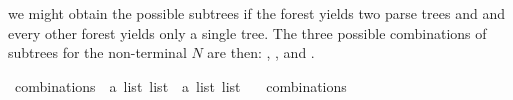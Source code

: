\begin{isabellebody}
\begin{isamarkuptext}
 we might obtain the possible subtrees  if the
forest  yields two parse trees  and  and every other forest yields only
a single tree. The three possible combinations of subtrees for the non-terminal $N$ are then: , ,
and .%
\end{isamarkuptext}\isamarkuptrue%
\isamarkupfalse%
\ combinations\ {\isacharcolon}{\kern0pt}{\isacharcolon}{\kern0pt}\ {\isachardoublequoteopen}{\isacharprime}{\kern0pt}a\ list\ list\ {\isasymRightarrow}\ {\isacharprime}{\kern0pt}a\ list\ list{\isachardoublequoteclose}\ \isanewline
\ \ {\isachardoublequoteopen}combinations\ {\isacharbrackleft}{\kern0pt}{\isacharbrackright}{\kern0pt}\ {\isacharequal}{\kern0pt}\ {\isacharbrackleft}{\kern0pt}{\isacharbrackleft}{\kern0pt}{\isacharbrackright}{\kern0pt}{\isacharbrackright}{\kern0pt}{\isachardoublequoteclose}\isanewline

\end{isabellebody}
